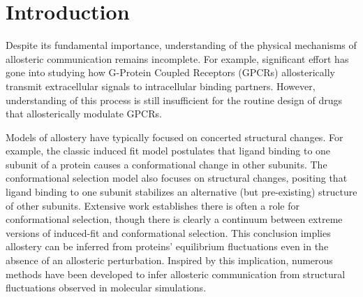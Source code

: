 \documentclass[../main.tex]{subfiles}
\begin{document}
    \section{Introduction}
    Despite its fundamental importance, understanding of the physical mechanisms of allosteric communication remains incomplete. For example, significant effort has gone into studying how G-Protein Coupled Receptors (GPCRs) allosterically transmit extracellular signals to intracellular binding partners\cite{Rosenbaum:2009id}. However, understanding of this process is still insufficient for the routine design of drugs that allosterically modulate GPCRs\cite{Shoichet:2012fm}.

    Models of allostery have typically focused on concerted structural changes\cite{Guo:2016hv}. For example, the classic induced fit model postulates that ligand binding to one subunit of a protein causes a conformational change in other subunits\cite{Koshland:1959ft,KoshlandJr:1966ffa}. The conformational selection model also focuses on structural changes, positing that ligand binding to one subunit stabilizes an alternative (but pre-existing) structure of other subunits\cite{Monod:1965io}. Extensive work establishes there is often a role for conformational selection\cite{Changeux:2011fv}, though there is clearly a continuum between extreme versions of induced-fit and conformational selection\cite{Csermely:2010cv,Silva:2011ct,Hammes:2009im}. This conclusion implies allostery can be inferred from proteins’ equilibrium fluctuations even in the absence of an allosteric perturbation. Inspired by this implication, numerous methods have been developed to infer allosteric communication from structural fluctuations observed in molecular simulations\cite{Ichiye:1991db,and:1999bo,PratulKAgarwal:2002dp,Agarwal:2002ema,Rod:2003vm,Lange:2006gv,Whitley:2009uq,Weinkam:2012jf,Lenaerts:2008kn,McClendon:2009gd,Dubay:2011ey,Feher:2014cx,Fenwick:2014fc,Cui:2008cc,Elber:2011dj,VanWart:2014dc,Malmstrom:2015kp,Chu:2005gh,Ravindranathan:2005ff,Weinkam:2013fj,Liu:2012em,Zhang2012}.
\end{document}
